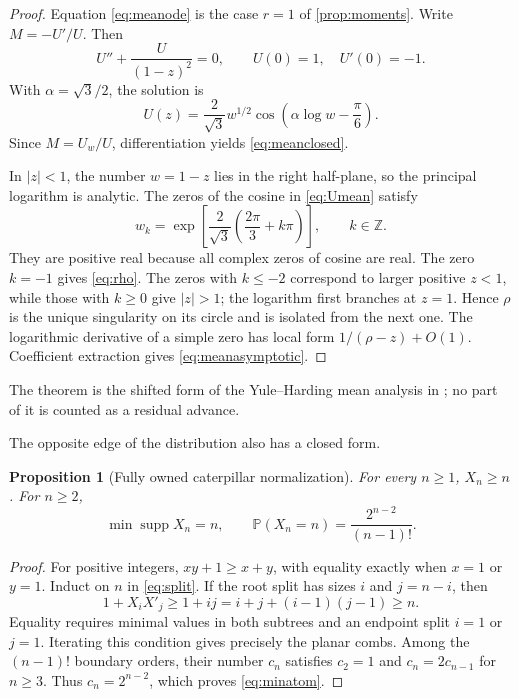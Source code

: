 \documentclass[10pt,a4paper]{amsart}
\newtheorem{proposition}[theorem]{Proposition}
\theoremstyle{definition}
\theoremstyle{remark}
\newcommand{\Pp}{\mathbb P}
\newcommand{\supp}{\operatorname{supp}}
\begin{document}
\begin{proof}
Equation \eqref{eq:meanode} is the case $r=1$ of
\cref{prop:moments}.  Write $M=-U'/U$.  Then
\[
 U''+\frac{U}{(1-z)^2}=0,\qquad U(0)=1,\quad U'(0)=-1.
\]
With $\alpha=\sqrt3/2$, the solution is
\begin{equation}\label{eq:Umean}
 U(z)=\frac2{\sqrt3}w^{1/2}
 \cos\!\left(\alpha\log w-\frac\pi6\right).
\end{equation}
Since $M=U_w/U$, differentiation yields \eqref{eq:meanclosed}.

In $|z|<1$, the number $w=1-z$ lies in the right half-plane, so the
principal logarithm is analytic.  The zeros of the cosine in
\eqref{eq:Umean} satisfy
\[
 w_k=\exp\!\left[\frac2{\sqrt3}
       \left(\frac{2\pi}{3}+k\pi\right)\right],
 \qquad k\in\mathbb Z.
\]
They are positive real because all complex zeros of cosine are real.  The
zero $k=-1$ gives \eqref{eq:rho}.  The zeros with $k\leq-2$ correspond to
larger positive $z<1$, while those with $k\geq0$ give $|z|>1$; the logarithm
first branches at $z=1$.  Hence $\rho$ is the unique singularity on its
circle and is isolated from the next one.  The logarithmic derivative of a
simple zero has local form $1/(\rho-z)+O(1)$.  Coefficient extraction gives
\eqref{eq:meanasymptotic}.
\end{proof}

The theorem is the shifted form of the Yule--Harding mean analysis in
\citet[Section~5.2]{DisantoEtAl2022}; no part of it is counted as a residual
advance.

The opposite edge of the distribution also has a closed form.

\begin{proposition}[Fully owned caterpillar normalization]\label{prop:minimum}
For every $n\geq1$, $X_n\geq n$.  For $n\geq2$,
\begin{equation}\label{eq:minatom}
       \min\supp X_n=n,
       \qquad
       \Pp(X_n=n)=\frac{2^{n-2}}{(n-1)!}.
\end{equation}
\end{proposition}

\begin{proof}
For positive integers, $xy+1\geq x+y$, with equality exactly when $x=1$ or
$y=1$.  Induct on $n$ in \eqref{eq:split}.  If the root split has sizes
$i$ and $j=n-i$, then
\[
 1+X_iX'_j\geq1+ij=i+j+(i-1)(j-1)\geq n.
\]
Equality requires minimal values in both subtrees and an endpoint split
$i=1$ or $j=1$.  Iterating this condition gives precisely the planar combs.
Among the $(n-1)!$ boundary orders, their number $c_n$ satisfies
$c_2=1$ and $c_n=2c_{n-1}$ for $n\geq3$.  Thus
$c_n=2^{n-2}$, which proves \eqref{eq:minatom}.
\end{proof}
\end{document}

